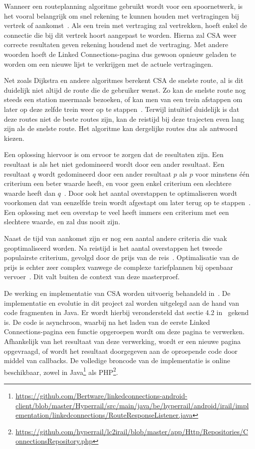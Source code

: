 Wanneer een routeplanning algoritme gebruikt wordt voor een spoornetwerk, is het vooral belangrijk om snel rekening te kunnen houden met vertragingen bij vertrek of aankomst~\citep{strasser14,strasser17}. Als een trein met vertraging zal vertrekken, hoeft enkel de connectie die bij dit vertrek hoort aangepast te worden. Hierna zal CSA weer correcte resultaten geven rekening houdend met de vertraging. Met andere woorden hoeft de Linked Connections-pagina dus gewoon opnieuw geladen te worden om een nieuwe lijst te verkrijgen met de actuele vertragingen. 

Net zoals Dijkstra en andere algoritmes berekent CSA de snelste route, al is dit duidelijk niet altijd de route die de gebruiker wenst. Zo kan de snelste route nog steeds een station meermaals bezoeken, of kan men van een trein afstappen om later op deze zelfde trein weer op te stappen~\citep{strasser14}. Terwijl intuïtief duidelijk is dat deze routes niet de beste routes zijn, kan de reistijd bij deze trajecten even lang zijn als de snelste route. Het algoritme kan dergelijke routes dus als antwoord kiezen.

Een oplossing hiervoor is om ervoor te zorgen dat de resultaten  zijn. Een resultaat is  als het niet gedomineerd wordt door een ander resultaat. Een resultaat $q$ wordt gedomineerd door een ander resultaat $p$ als $p$ voor minstens één criterium een beter waarde heeft, en voor geen enkel criterium een slechtere waarde heeft dan $q$~\citep{hannemann08,strasser17}. Door ook het aantal overstappen te optimaliseren wordt voorkomen dat van eenzelfde trein wordt afgestapt om later terug op te stappen~\citep{strasser14}. Een oplossing met een overstap te veel heeft immers een criterium met een slechtere waarde, en zal dus nooit  zijn.

Naast de tijd van aankomst zijn er nog een aantal andere criteria die vaak geoptimaliseerd worden. Na reistijd is het aantal overstappen het tweede populairste criterium, gevolgd door de prijs van de reis~\citep{strasser17}. Optimalisatie van de prijs is echter zeer complex vanwege de complexe tariefplannen bij openbaar vervoer~\citep{muller06}. Dit valt buiten de context van deze masterproef.

De werking en implementatie van CSA worden uitvoerig behandeld in~\citep{strasser17}.
De implementatie en evolutie in dit project zal worden uitgelegd aan de hand van code fragmenten in Java. Er wordt hierbij verondersteld dat sectie 4.2 in~\cite{strasser17} gekend is. De code is asynchroon, waarbij na het laden van de eerste Linked Connections-pagina een  functie opgeroepen wordt om deze pagina te verwerken. Afhankelijk van het resultaat van deze verwerking, wordt er een nieuwe pagina opgevraagd, of wordt het resultaat doorgegeven aan de oproepende code door middel van callbacks. 
De volledige broncode van de implementatie is online beschikbaar, zowel in  Java\footnote{\url{https://github.com/Bertware/linkedconnections-android-client/blob/master/Hyperrail/src/main/java/be/hyperrail/android/irail/implementation/linkedconnections/RouteResponseListener.java}} als PHP\footnote{\url{https://github.com/hyperrail/lc2irail/blob/master/app/Http/Repositories/ConnectionsRepository.php}}.

